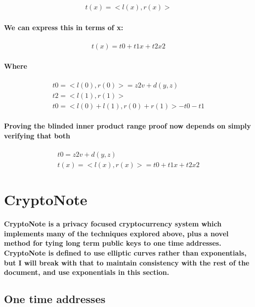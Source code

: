 \documentclass{article}
\begin{document}
\begin{eqnarray}
  t(x) = <l(x), r(x)> 
\end{eqnarray}

\paragraph{We can express this in terms of x:}

\begin{eqnarray}
  t(x) = t0 + t1 x + t2 x2
\end{eqnarray}

\paragraph{Where}

\begin{eqnarray}
  t0 = <l(0), r(0)> = z2 v + d(y,z)\\
  t2 = <l(1), r(1)>\\
  t0 = <l(0) + l(1), r(0) + r(1)> - t0 - t1
\end{eqnarray}

\paragraph{Proving the blinded inner product range proof now depends on simply verifying that both }

\begin{eqnarray}
  t0 = z2 v + d(y,z)\\
  t(x) = <l(x), r(x)> = t0 + t1 x + t2 x2
\end{eqnarray}



\section{CryptoNote}

\paragraph{CryptoNote is a privacy focused cryptocurrency system which implements many of the techniques explored above, plus a novel method for tying long term public keys to one time addresses.  CryptoNote is defined to use elliptic curves rather than exponentials, but I will break with that to maintain consistency with the rest of the document, and use exponentials in this section.}


\subsection{One time addresses}
\end{document}
